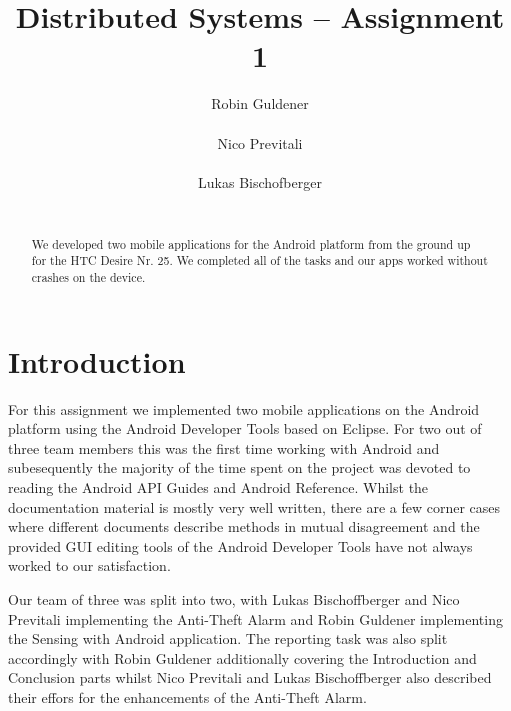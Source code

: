 \documentclass{report}
\title{Distributed Systems -- Assignment 1}
\author{
%
%
\alignauthor Robin Guldener\\
	\affaddr{ETH ID 11-930-369}\\
	\email{robing@student.ethz.ch}
\alignauthor Nico Previtali\\
	\affaddr{ETH ID 11-926-433}\\
	\email{pnico@student.ethz.ch}
\alignauthor Lukas Bischofberger\\
	\affaddr{ETH ID 11-915-907}\\
	\email{lukasbi@student.ethz.ch}
}
\begin{document}
\maketitle

\begin{abstract}

We developed two mobile applications for the Android platform from the ground up for the HTC Desire Nr. 25. We completed all of the tasks and our apps worked without crashes on the device.
\end{abstract}

\section{Introduction}

For this assignment we implemented two mobile applications on the Android platform using the Android Developer Tools based on Eclipse\cite{androidDevTools}. For two out of three team members this was the first time working with Android and subesequently the majority of the time spent on the project was devoted to reading the Android API Guides\cite{androidAPIGuides} and Android Reference\cite{androidAPIReference}. Whilst the documentation material is mostly very well written, there are a few corner cases where different documents describe methods in mutual disagreement and the provided GUI editing tools of the Android Developer Tools have not always worked to our satisfaction.

Our team of three was split into two, with Lukas Bischoffberger and Nico Previtali implementing the Anti-Theft Alarm and Robin Guldener implementing the Sensing with Android application. The reporting task was also split accordingly with Robin Guldener additionally covering the Introduction and Conclusion parts whilst Nico Previtali and Lukas Bischoffberger also described their effors for the enhancements of the Anti-Theft Alarm.

\end{document}
